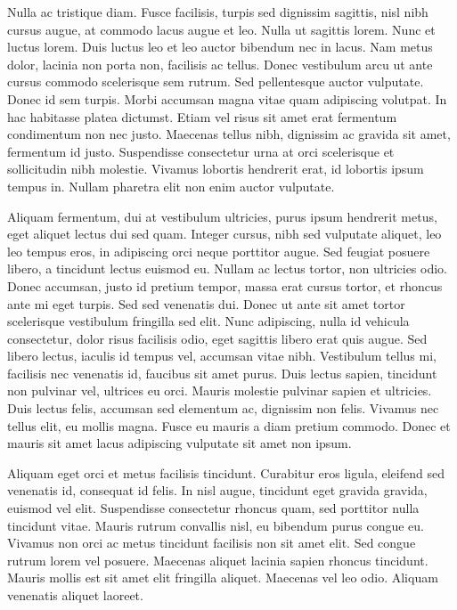 \documentclass{EPUProjetDi}
\begin{document}
Nulla ac tristique diam. Fusce facilisis, turpis sed dignissim sagittis, nisl nibh cursus augue, at commodo lacus augue et leo. Nulla ut sagittis lorem. Nunc et luctus lorem. Duis luctus leo et leo auctor bibendum nec in lacus. Nam metus dolor, lacinia non porta non, facilisis ac tellus. Donec vestibulum arcu ut ante cursus commodo scelerisque sem rutrum. Sed pellentesque auctor vulputate. Donec id sem turpis. Morbi accumsan magna vitae quam adipiscing volutpat. In hac habitasse platea dictumst. Etiam vel risus sit amet erat fermentum condimentum non nec justo. Maecenas tellus nibh, dignissim ac gravida sit amet, fermentum id justo. Suspendisse consectetur urna at orci scelerisque et sollicitudin nibh molestie. Vivamus lobortis hendrerit erat, id lobortis ipsum tempus in. Nullam pharetra elit non enim auctor vulputate.

Aliquam fermentum, dui at vestibulum ultricies, purus ipsum hendrerit metus, eget aliquet lectus dui sed quam. Integer cursus, nibh sed vulputate aliquet, leo leo tempus eros, in adipiscing orci neque porttitor augue. Sed feugiat posuere libero, a tincidunt lectus euismod eu. Nullam ac lectus tortor, non ultricies odio. Donec accumsan, justo id pretium tempor, massa erat cursus tortor, et rhoncus ante mi eget turpis. Sed sed venenatis dui. Donec ut ante sit amet tortor scelerisque vestibulum fringilla sed elit. Nunc adipiscing, nulla id vehicula consectetur, dolor risus facilisis odio, eget sagittis libero erat quis augue. Sed libero lectus, iaculis id tempus vel, accumsan vitae nibh. Vestibulum tellus mi, facilisis nec venenatis id, faucibus sit amet purus. Duis lectus sapien, tincidunt non pulvinar vel, ultrices eu orci. Mauris molestie pulvinar sapien et ultricies. Duis lectus felis, accumsan sed elementum ac, dignissim non felis. Vivamus nec tellus elit, eu mollis magna. Fusce eu mauris a diam pretium commodo. Donec et mauris sit amet lacus adipiscing vulputate sit amet non ipsum.

Aliquam eget orci et metus facilisis tincidunt. Curabitur eros ligula, eleifend sed venenatis id, consequat id felis. In nisl augue, tincidunt eget gravida gravida, euismod vel elit. Suspendisse consectetur rhoncus quam, sed porttitor nulla tincidunt vitae. Mauris rutrum convallis nisl, eu bibendum purus congue eu. Vivamus non orci ac metus tincidunt facilisis non sit amet elit. Sed congue rutrum lorem vel posuere. Maecenas aliquet lacinia sapien rhoncus tincidunt. Mauris mollis est sit amet elit fringilla aliquet. Maecenas vel leo odio. Aliquam venenatis aliquet laoreet.
\end{document}
